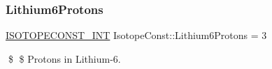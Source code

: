 \subsubsection{\texorpdfstring{Lithium6\+Protons}{Lithium6Protons}}
{\footnotesize\ttfamily \mbox{\hyperlink{group___isotope_const-_macros_ga5f18360b3e99483a35c32d789e62621c}{I\+S\+O\+T\+O\+P\+E\+C\+O\+N\+S\+T\+\_\+\+I\+NT}} Isotope\+Const\+::\+Lithium6\+Protons = 3}

\$ \$ Protons in Lithium-\/6. 